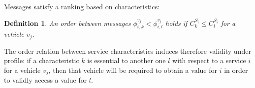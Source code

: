 \documentclass[compsoc, conference, letterpaper, 10pt, times]{IEEEtran}
\newtheorem{definition}{Definition}
\begin{document}
Messages satisfy a ranking based on characteristics:

\begin{definition}\label{def:dependencypackages}
An order between messages $\phi^{v_{j}}_{i,k}<\phi^{v_{j}}_{i,l}$ holds if $C^{S_{i}}_{k}\leq C^{S_{i}}_{l}$ for a vehicle $v_{j}$.
%
\end{definition}

The order relation between service characteristics induces therefore validity under profile: if a characteristic $k$ is essential to another one $l$ with respect to a service $i$ for a vehicle $v_{j}$, then that vehicle will be required to obtain a value for  $i$ in order to validly access a value for $l$. 

%
\end{document}

